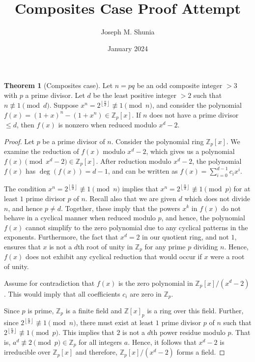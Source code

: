 \documentclass{article}
\title{Composites Case Proof Attempt}
\author{Joseph M. Shunia}
\date{January 2024}
\theoremstyle{plain}
\theoremstyle{definition}
\newtheorem{theorem}{Theorem}
\begin{document}
\maketitle

\begin{theorem}[Composites case] \label{theorem:composites}
Let $n = pq$ be an odd composite integer $>3$ with $p$ a prime divisor. Let $d$ be the least positive integer $>2$ such that $n \not\equiv 1 \pmod{d}$. Suppose $x^n = 2^{\left\lfloor\frac{n}{d}\right\rfloor} \not\equiv 1 \pmod{n}$, and consider the polynomial $f(x) = (1 + x)^n - (1 + x^n) \in \mathbb{Z}_p[x]$. If $n$ does not have a prime divisor $\leq d$, then $f(x)$ is nonzero when reduced modulo $x^d - 2$.
\end{theorem}
\begin{proof}
Let $p$ be a prime divisor of $n$. Consider the polynomial ring $\mathbb{Z}_p[x]$. We examine the reduction of $ f(x) $ modulo $x^d - 2$, which gives us a polynomial $f(x) \pmod{x^d - 2} \in \mathbb{Z}_p[x]$. After reduction modulo $x^d - 2$, the polynomial $f(x)$ has $\deg(f(x)) = d-1$, and can be written as $f(x) = \sum_{i=0}^{d-1} c_i x^i$.

The condition $x^n = 2^{\left\lfloor\frac{n}{d}\right\rfloor} \not\equiv 1 \pmod{n}$ implies that $x^n = 2^{\left\lfloor\frac{n}{d}\right\rfloor} \not\equiv 1 \pmod{p}$ for at least $1$ prime divisor $p$ of $n$. Recall also that we are given $d$ which does not divide $n$, and hence $p \not= d$. Together, these imply that the powers $x^k$ in $f(x)$ do not behave in a cyclical manner when reduced modulo $p$, and hence, the polynomial $f(x)$ cannot simplify to the zero polynomial due to any cyclical patterns in the exponents. Furthermore, the fact that $x^d = 2$ in our quotient ring, and not $1$, ensures that $x$ is not a $d$th root of unity in $\mathbb{Z}_p$ for any prime $p$ dividing $n$. Hence, $f(x)$ does not exhibit any cyclical reduction that would occur if $x$ were a root of unity.

Assume for contradiction that $f(x)$ is the zero polynomial in $\mathbb{Z}_p[x]/(x^d - 2)$. This would imply that all coefficients $c_i$ are zero in $\mathbb{Z}_p$.

Since $p$ is prime, $\mathbb{Z}_p$ is a finite field and $\mathbb{Z}[x]_p$ is a ring over this field. Further, since $2^{\left\lfloor\frac{n}{d}\right\rfloor} \not\equiv 1 \pmod{n}$, there must exist at least $1$ prime divisor $p$ of $n$ such that $2^{\left\lfloor\frac{n}{d}\right\rfloor} \not\equiv 1 \pmod{p}$. This implies that $2$ is not a $d$th power residue modulo $p$. That is, $a^d \not\equiv 2 \pmod{p} \in \mathbb{Z}_p$ for all integers $a$. Hence, it follows that $x^d - 2$ is irreducible over $\mathbb{Z}_p[x]$ and therefore, $\mathbb{Z}_p[x]/(x^d - 2)$ forms a field.


\end{proof}
\end{document}

